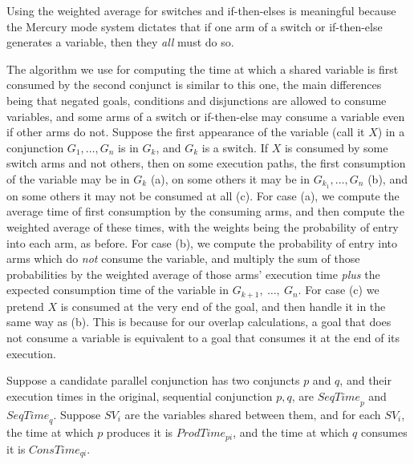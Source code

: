 \noindent
Using the weighted average for switches and if-then-elses is meaningful because
the Mercury mode system dictates
that if one arm of a switch or if-then-else generates a variable,
then they \emph{all} must do so.

The algorithm we use for computing the time
at which a shared variable is first consumed by the second conjunct
is similar to this one,
the main differences being that
negated goals, conditions and disjunctions are allowed to consume variables,
and some arms of a switch or if-then-else
may consume a variable even if other arms do not.
Suppose the first appearance of the variable (call it $X$)
in a conjunction $G_1, \ldots, G_n$ is in $G_k$, and $G_k$ is a switch.
If $X$ is consumed by some switch arms and not others,
then on some execution paths,
the first consumption of the variable may be in $G_k$ (a),
on some others it may be in $G_{k_1}, \ldots, G_n$ (b),
and on some others it may not be consumed at all (c).
For case (a),
we compute the average time of first consumption by the consuming arms,
and then compute the weighted average of these times,
with the weights being the probability of entry into each arm, as before.
For case (b), we compute the probability of entry
into arms which do \emph{not} consume the variable,
and multiply the sum of those probabilities
by the weighted average of those arms' execution time
\emph{plus} the expected consumption time of the variable
in $G_{k+1},~\ldots,~G_n$.
For case (c)
we pretend $X$ is consumed at the very end of the goal,
and then handle it in the same way as (b).
This is because for our overlap calculations,
a goal that does not consume a variable is equivalent to
a goal that consumes it at the end of its execution.


Suppose a candidate parallel conjunction has two conjuncts $p$ and $q$,
and their execution times in the original, sequential conjunction $p, q$,
are ${SeqTime}_p$ and ${SeqTime}_q$.
Suppose ${SV}_i$ are the variables shared between them,
and for each ${SV}_i$,
the time at which $p$ produces it is ${ProdTime}_{pi}$, and
the time at which $q$ consumes it is ${ConsTime}_{qi}$.


